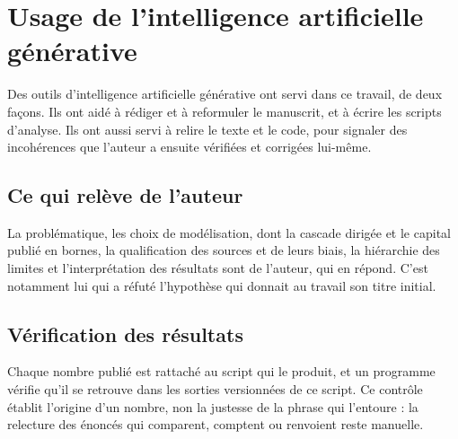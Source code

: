 \chapter{Usage de l'intelligence artificielle générative}
\label{ann:ia}


Des outils d'intelligence artificielle générative ont servi dans ce travail, de deux façons. Ils
ont aidé à rédiger et à reformuler le manuscrit, et à écrire les scripts d'analyse. Ils ont aussi
servi à relire le texte et le code, pour signaler des incohérences que l'auteur a ensuite vérifiées
et corrigées lui-même.

\section{Ce qui relève de l'auteur}

La problématique, les choix de modélisation, dont la cascade dirigée et le capital publié en
bornes, la qualification des sources et de leurs biais, la hiérarchie des limites et
l'interprétation des résultats sont de l'auteur, qui en répond. C'est notamment lui qui a réfuté
l'hypothèse qui donnait au travail son titre initial.

\section{Vérification des résultats}

Chaque nombre publié est rattaché au script qui le produit, et un programme vérifie qu'il se
retrouve dans les sorties versionnées de ce script. Ce contrôle établit l'origine d'un nombre, non
la justesse de la phrase qui l'entoure : la relecture des énoncés qui comparent, comptent ou
renvoient reste manuelle.

